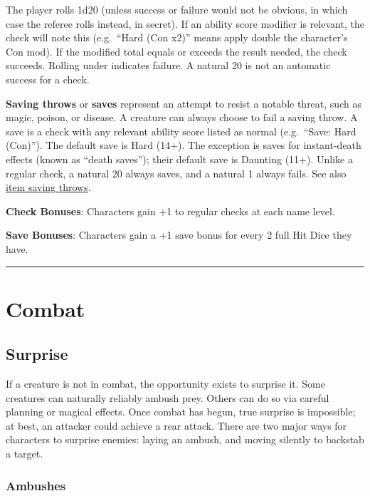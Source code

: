 \documentclass{article}
\begin{document}
\begin{multicols}{2}
The player rolls 1d20 (unless success or failure would not be obvious,
in which case the referee rolls instead, in secret). If an ability score
modifier is relevant, the check will note this (e.g.~``Hard (Con x2)''
means apply double the character's Con mod). If the modified total
equals or exceeds the result needed, the check succeeds. Rolling under
indicates failure. A natural 20 is not an automatic success for a check.

\textbf{Saving throws} or \textbf{saves} represent an attempt to resist
a notable threat, such as magic, poison, or disease. A creature can
always choose to fail a saving throw. A save is a check with any
relevant ability score listed as normal (e.g.~``Save: Hard (Con)''). The
default save is Hard (14+). The exception is saves for instant-death
effects (known as ``death saves''); their default save is Daunting
(11+). Unlike a regular check, a natural 20 always saves, and a natural
1 always fails. See also \hyperref[item-saving-throws]{item saving
throws}.

\textbf{Check Bonuses}: Characters gain +1 to regular checks at each
name level.

\textbf{Save Bonuses}: Characters gain a +1 save bonus for every 2 full
Hit Dice they have.

\begin{center}\rule{0.5\linewidth}{0.5pt}\end{center}

\section{Combat}\label{combat}

\subsection{Surprise}\label{surprise}

If a creature is not in combat, the opportunity exists to surprise it.
Some creatures can naturally reliably ambush prey. Others can do so via
careful planning or magical effects. Once combat has begun, true
surprise is impossible; at best, an attacker could achieve a rear
attack. There are two major ways for characters to surprise enemies:
laying an ambush, and moving silently to backstab a target.

\subsubsection{Ambushes}\label{ambushes}


\end{multicols}
\end{document}
